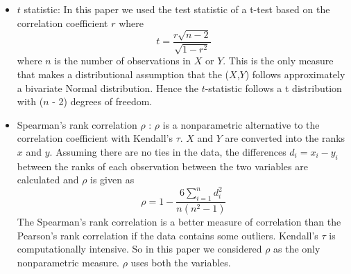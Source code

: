 \documentclass[12]{report}
\begin{document}
\begin{itemize}
\item $t$ statistic: In this paper we used the test statistic of a t-test based on the correlation coefficient $r$ where $$t =\frac{r \sqrt{n - 2}}{\sqrt{1 - r^2}}$$ where $n$ is the number of observations in $X$ or $Y$. This is the only measure that makes a distributional assumption that the ($X$,$Y$) follows approximately a bivariate Normal distribution. Hence the $t$-statistic follows a t distribution with ($n$ - 2) degrees of freedom.


\item Spearman's rank correlation $\rho$ : $\rho$ is a nonparametric alternative to the correlation coefficient with Kendall's $\tau$. $X$ and $Y$ are converted into the ranks $x$ and $y$. Assuming there are no ties in the data, the differences $d_i=x_i - y_i$ between the ranks of each observation between the two variables are calculated and $\rho$ is given as $$\rho = 1 - \frac{6\sum_{i=1}^n d_i^2}{n(n^2 - 1)}$$ The Spearman's rank correlation is a better measure of correlation than the Pearson's rank correlation if the data contains some outliers. Kendall's $\tau$ is computationally intensive.
So in this paper we considered $\rho$ as the only nonparametric measure.
$\rho$ uses both the variables. 

\end{itemize}
\end{document}
